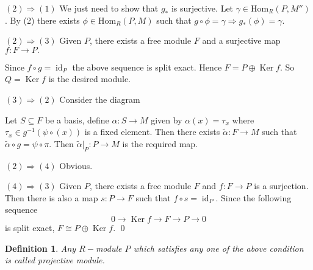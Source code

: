 \documentclass[11pt]{amsart}
\newtheorem{defn}[theorem]{Definition}
\newcommand{\Hom}[1]{\text{Hom}_R\left(#1\right)}
\DeclareMathOperator{\Ker}{\text{Ker}}
\DeclareMathOperator{\id}{\text{id}}
\begin{document}
$(2)\Rightarrow (1)$ We just need to show that $g_*$ is surjective. Let $\gamma\in \Hom{P,M''}$. By (2) there exists $\phi\in \Hom{P,M}$ such that $g\circ \phi=\gamma\Rightarrow g_*(\phi)=\gamma.$

$(2)\Rightarrow (3)$ Given $P$, there exists a free module $F$ and a surjective map $f:F\to P.$

\begin{center}


\end{center}

Since $f\circ g=\id_P$ the above sequence is split exact. Hence $F=P\oplus \Ker f$. So $Q=\Ker f$ is the desired module.

$(3) \Rightarrow (2)$ Consider the diagram 

\begin{center}


\end{center}

Let $S\subseteq F$ be a basis, define $\alpha:S\to M$ given by $\alpha(x)=\tau_x$ where $\tau_x\in g^{-1}(\psi\circ (x))$ is a fixed element. Then there exists $\tilde{\alpha}:F\to M$ such that $\tilde{\alpha}\circ g=\psi\circ \pi.$ Then $\tilde{\alpha}|_P:P\to M$ is the required map.

$(2)\Rightarrow (4)$ Obvious.

$(4)\Rightarrow (3)$ Given $P$, there exists a free module $F$ and $f:F\to P$ is a surjection. Then there is also a map $s:P\to F$ such that $f\circ s=\id_P.$ Since the following sequence $$0\to\Ker f\to F\to P\to 0$$ is split exact, $F\cong P\oplus \Ker f.$ \qed

\begin{defn}
Any $R-$module $P$ which satisfies any one of the above condition is called projective module.
\end{defn}
\end{document}
